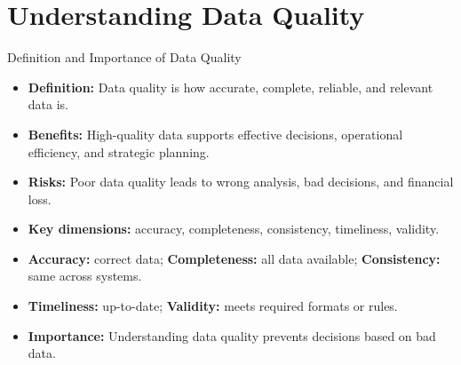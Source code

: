 \documentclass[aspectratio=169, table]{beamer}
\begin{document}
\section{Understanding Data Quality}

\begin{frame}{Definition and Importance of Data Quality}
	\vspace{20pt}
	
	\begin{itemize}
		\item \textbf{Definition:} Data quality is how accurate, complete, reliable, and relevant data is.
		
		\item \textbf{Benefits:} High-quality data supports effective decisions, operational efficiency, and strategic planning.
		
		\item \textbf{Risks:} Poor data quality leads to wrong analysis, bad decisions, and financial loss.
		
		\item \textbf{Key dimensions:} accuracy, completeness, consistency, timeliness, validity.
		
		\item \textbf{Accuracy:} correct data; \textbf{Completeness:} all data available; \textbf{Consistency:} same across systems.
		
		\item \textbf{Timeliness:} up-to-date; \textbf{Validity:} meets required formats or rules.
		
		\item \textbf{Importance:} Understanding data quality prevents decisions based on bad data.
	\end{itemize}
	
\end{frame}
\end{document}
